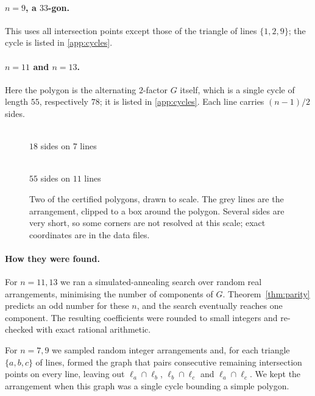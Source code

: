 \paragraph{$n=9$, a $33$-gon.} This uses all intersection points except those of the triangle of lines
$\{1,2,9\}$; the cycle is listed in \cref{app:cycles}.

\paragraph{$n=11$ and $n=13$.} Here the polygon is the alternating $2$-factor $G$ itself, which is a
single cycle of length $55$, respectively $78$; it is listed in \cref{app:cycles}. Each line carries
$(n-1)/2$ sides.

\begin{figure}[h]
\centering
\begin{minipage}{0.48\textwidth}\centering\resizebox{\textwidth}{!}{}\\[2pt]
\small $18$ sides on $7$ lines\end{minipage}\hfill
\begin{minipage}{0.48\textwidth}\centering\resizebox{\textwidth}{!}{}\\[2pt]
\small $55$ sides on $11$ lines\end{minipage}
\caption{Two of the certified polygons, drawn to scale. The grey lines are the arrangement, clipped
to a box around the polygon. Several sides are very short, so some corners are not resolved at this
scale; exact coordinates are in the data files.}\label{fig:polys}
\end{figure}

\paragraph{How they were found.} For $n=11,13$ we ran a simulated-annealing search over random real
arrangements, minimising the number of components of $G$. Theorem~\ref{thm:parity} predicts an odd number for
these $n$, and the search eventually reaches one component. The resulting coefficients were rounded
to small integers and re-checked with exact rational arithmetic.

For $n=7,9$ we sampled random integer arrangements and, for each triangle $\{a,b,c\}$ of lines, formed
the graph that pairs consecutive remaining intersection points on every line, leaving out
$\ell_a\cap\ell_b$, $\ell_b\cap\ell_c$ and $\ell_a\cap\ell_c$. We kept the arrangement when this graph
was a single cycle bounding a simple polygon.

